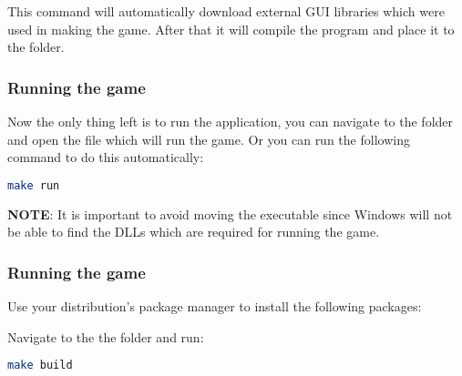 This command will automatically download external GUI libraries which were used
in making the game. After that it will compile the program and place it to the
 folder.

\subsubsection{Running the game}

Now the only thing left is to run the application, you can navigate to the 
folder and open the  file which will run the game. Or you
can run the following command to do this automatically:

\begin{lstlisting}[language=bash]
    make run
\end{lstlisting}

\textbf{NOTE}: It is important to avoid moving the executable since Windows will not
be able to find the DLLs which are required for running the game.


\subsubsection{Running the game}
Use your distribution’s package manager to install the following packages:


Navigate to the the  folder and run:

\begin{lstlisting}[language=bash]
    make build
\end{lstlisting}